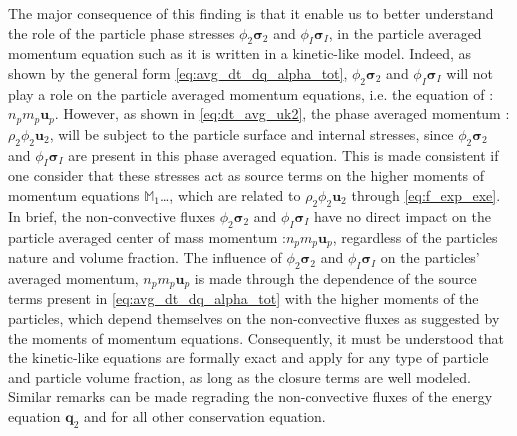 The major consequence of this finding is that it enable us to better understand the role of the particle phase stresses $\phi_2\bm{\sigma}_2$ and $\phi_I\bm{\sigma}_I$, in the particle averaged momentum equation such as it is written in a kinetic-like model. 
Indeed, as shown by the general form \ref{eq:avg_dt_dq_alpha_tot}, $\phi_2\bm{\sigma}_2$ and $\phi_I\bm{\sigma}_I$ will not play a role on the particle averaged momentum equations, i.e. the equation of : $n_p m_p \textbf{u}_p$. 
However, as shown in \ref{eq:dt_avg_uk2}, the phase averaged momentum : $\rho_2 \phi_2 \textbf{u}_2$,  will be subject to the particle surface and internal stresses, since $\phi_2\bm{\sigma}_2$ and $\phi_I\bm{\sigma}_I$ are present in this phase averaged equation.
This is made consistent if one consider that these stresses act as source terms on the higher moments of momentum equations $\mathbb{M}_1$\ldots, which are related to $\rho_2 \phi_2 \textbf{u}_2$ through \ref{eq:f_exp_exe}. 
In brief, the non-convective fluxes $\phi_2\bm{\sigma}_2$ and $\phi_I\bm{\sigma}_I$  have no direct impact on the particle averaged center of mass momentum :$n_pm_p\textbf{u}_p$, regardless of the particles nature and volume fraction. 
The influence of $\phi_2\bm{\sigma}_2$ and $\phi_I\bm{\sigma}_I$ on the particles' averaged momentum, $n_p m_p \textbf{u}_p$ is made through the dependence of the source terms present in \ref{eq:avg_dt_dq_alpha_tot} with the higher moments of the particles, which depend themselves on the non-convective fluxes as suggested by the moments of momentum equations. 
Consequently, it must be understood that the kinetic-like equations are formally exact and apply for any type of particle and particle volume fraction, as long as the closure terms are well modeled. 
Similar remarks can be made regrading the non-convective fluxes of the energy equation $\textbf{q}_2$ and for all other conservation equation. 


